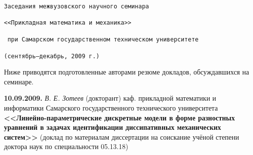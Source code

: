 %
%
%
%


\renewcommand{\firstpage}{263} %
\renewcommand{\lastpage}{274} %


  \rhead[]{\fancyplain{\Vestnik}{}}
  \lhead[\fancyplain{\Vestnik}{}]{}
  \cfoot[]{}
  \lfoot[\thepage]{}
  \rfoot[]{\thepage}
  \plainheadrulewidth=0.7pt
  \headrulewidth=0.4pt

  \pagestyle{fancyplain}

  \thispagestyle{plain}




\normalfont


$\;$
\bigskip

\begin{center}
{\large \texttt{Заседания межвузовского научного семинара}}

{\large \texttt{<<Прикладная математика и механика>>}}

{\large \texttt{ при Самарском государственном техническом университете}}


{\large \texttt{(сентябрь--декабрь, 2009 г.)}}
\end{center}

Ниже приводятся подготовленные авторами резюме докладов, обсуждавшихся на семинаре.






\bigskip

\noindent
{\bf 10.09.2009.} {\it В. Е. Зотеев} {\footnotesize (докторант) каф. прикладной математики и информатики Самарского государственного технического университета} \\
{\bf <<Линейно-параметрические дискретные модели в форме разностных уравнений в задачах идентификации диссипативных механических систем>> } {\footnotesize (доклад по материалам диссертации на соискание учёной степени доктора наук по специальности 05.13.18)}

